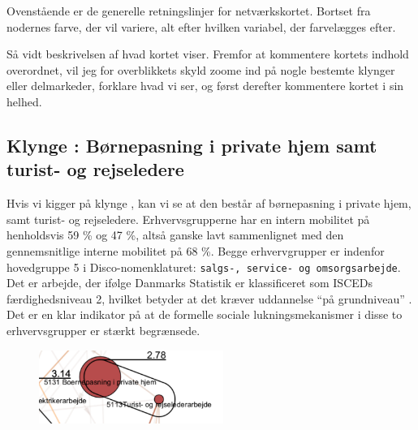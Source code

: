 Ovenstående er de generelle retningslinjer for netværkskortet. Bortset fra nodernes farve, der vil variere, alt efter hvilken variabel, der farvelægges efter. 

Så vidt beskrivelsen af hvad kortet viser. Fremfor at kommentere kortets indhold overordnet, vil jeg for overblikkets skyld zoome ind på nogle bestemte klynger eller delmarkeder, forklare hvad vi ser, og først derefter kommentere kortet i sin helhed.

\subsection{Klynge : Børnepasning i private hjem samt turist- og rejseledere}

Hvis vi kigger på klynge , kan vi se at den består af børnepasning i private hjem, samt turist- og rejseledere. Erhvervsgrupperne har en intern mobilitet på henholdsvis  59 \% og 47 \%, altså ganske lavt sammenlignet med den gennemsnitlige interne mobilitet på 68 \%.  Begge erhvervgrupper er indenfor hovedgruppe 5 i Disco-nomenklaturet: \texttt{salgs-, service- og omsorgsarbejde}. Det er arbejde, der ifølge Danmarks Statistik er klassificeret som ISCEDs færdighedsniveau 2, hvilket betyder at det kræver uddannelse “på grundniveau” \parencite[tabel 1]{DSTDISCO88}. Det er en klar indikator på at de formelle sociale lukningsmekanismer i disse to erhvervsgrupper er stærkt begrænsede.

%
\begin{figure}
  \vspace{-20pt}
  \begin{center}
    \includegraphics[width=6cm]{fig/segzoom/seg_2_78_internmob.pdf}
   \caption{}
   \label{fig_delanalyse1_zoom_2_78}
  \end{center}
  \vspace{-20pt}
\end{figure}
%

